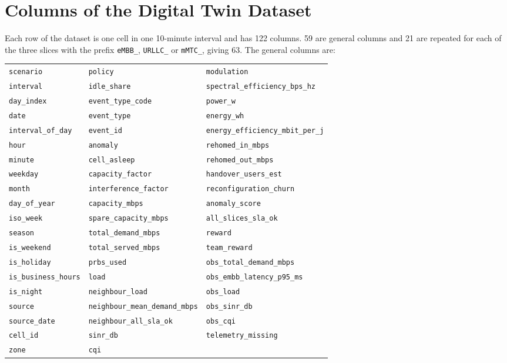 \label{app:columns}
\section{Columns of the Digital Twin Dataset}
Each row of the dataset is one cell in one 10-minute interval and has 122 columns. 59 are general columns and 21 are repeated for each of the three slices with the prefix \texttt{eMBB\_}, \texttt{URLLC\_} or \texttt{mMTC\_}, giving 63. The general columns are:

\begin{center}
\footnotesize
\begin{tabular}{lll}
\texttt{scenario} & \texttt{policy} & \texttt{modulation} \\
\texttt{interval} & \texttt{idle\_share} & \texttt{spectral\_efficiency\_bps\_hz} \\
\texttt{day\_index} & \texttt{event\_type\_code} & \texttt{power\_w} \\
\texttt{date} & \texttt{event\_type} & \texttt{energy\_wh} \\
\texttt{interval\_of\_day} & \texttt{event\_id} & \texttt{energy\_efficiency\_mbit\_per\_j} \\
\texttt{hour} & \texttt{anomaly} & \texttt{rehomed\_in\_mbps} \\
\texttt{minute} & \texttt{cell\_asleep} & \texttt{rehomed\_out\_mbps} \\
\texttt{weekday} & \texttt{capacity\_factor} & \texttt{handover\_users\_est} \\
\texttt{month} & \texttt{interference\_factor} & \texttt{reconfiguration\_churn} \\
\texttt{day\_of\_year} & \texttt{capacity\_mbps} & \texttt{anomaly\_score} \\
\texttt{iso\_week} & \texttt{spare\_capacity\_mbps} & \texttt{all\_slices\_sla\_ok} \\
\texttt{season} & \texttt{total\_demand\_mbps} & \texttt{reward} \\
\texttt{is\_weekend} & \texttt{total\_served\_mbps} & \texttt{team\_reward} \\
\texttt{is\_holiday} & \texttt{prbs\_used} & \texttt{obs\_total\_demand\_mbps} \\
\texttt{is\_business\_hours} & \texttt{load} & \texttt{obs\_embb\_latency\_p95\_ms} \\
\texttt{is\_night} & \texttt{neighbour\_load} & \texttt{obs\_load} \\
\texttt{source} & \texttt{neighbour\_mean\_demand\_mbps} & \texttt{obs\_sinr\_db} \\
\texttt{source\_date} & \texttt{neighbour\_all\_sla\_ok} & \texttt{obs\_cqi} \\
\texttt{cell\_id} & \texttt{sinr\_db} & \texttt{telemetry\_missing} \\
\texttt{zone} & \texttt{cqi} &  \\
\end{tabular}
\end{center}

